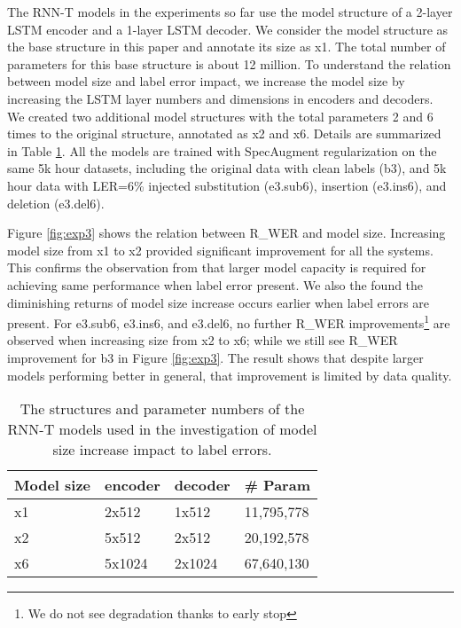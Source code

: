 \documentclass{article}
\begin{document}
The RNN-T models in the experiments so far use the model structure of a 2-layer LSTM encoder and a 1-layer LSTM decoder. We consider the model structure as the base structure in this paper and annotate its size as x1. The total number of parameters for this base structure is about 12 million. To understand the relation between model size and label error impact, we increase the model size by increasing the LSTM layer numbers and dimensions in encoders and decoders. We created two additional model structures with the total parameters 2 and 6 times to the original structure, annotated as x2 and x6. Details are summarized in Table \ref{tab:param_num}. All the models are trained with SpecAugment regularization on the same 5k hour datasets, including the original data with clean labels (b3), and 5k hour data with LER=6\% injected substitution (e3.sub6), insertion (e3.ins6), and deletion (e3.del6).

Figure \ref{fig:exp3} shows the relation between R\_WER and model size. Increasing model size from x1 to x2 provided significant improvement for all the systems. This confirms the observation from \cite{Arplt2017} that larger model capacity is required for achieving same performance when label error present. We also the found the diminishing returns of model size increase occurs earlier when label errors are present. For e3.sub6, e3.ins6, and e3.del6, no further R\_WER improvements\footnote{We do not see degradation thanks to early stop} are observed when increasing size from x2 to x6; while we still see R\_WER improvement for b3 in Figure \ref{fig:exp3}. The result shows that despite larger models performing better in general, that improvement is limited by data quality.

\begin{table}[h]
	\caption{The structures and parameter numbers of the RNN-T models used in the investigation of model size increase impact to label errors.}
	\label{tab:param_num}
	\centering
	\begin{tabular}{|l|l|l|l|}
		\hline
		Model size       & encoder & decoder & \# Param   \\ \hline
		x1       & 2x512   & 1x512   & 11,795,778 \\ \hline
		x2  & 5x512   & 2x512   & 20,192,578 \\ \hline
		x6  & 5x1024  & 2x1024  & 67,640,130 \\ \hline
	\end{tabular}
\end{table}
\end{document}
